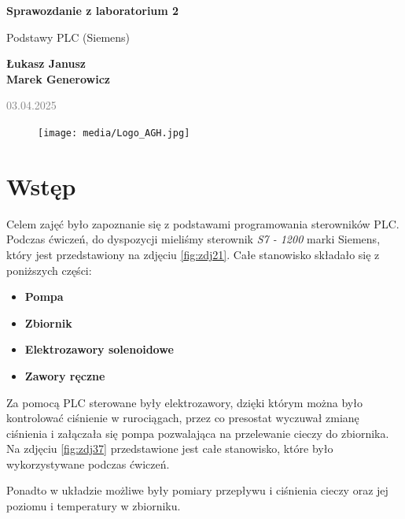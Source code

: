 \documentclass{article}
\begin{document}
\begin{titlepage}
    \begin{center}
        \vspace*{1cm}
            
        \Huge
        \textbf{Sprawozdanie z laboratorium 2}
            
        \vspace{0.5cm}
        \LARGE
        Podstawy PLC (Siemens) 
            
        \vspace{1.5cm}
            
        \textbf{Łukasz Janusz\\Marek Generowicz}

        \normalsize      
        \textcolor{gray}{03.04.2025}
        \vfill
        \begin{figure}[hb]
            \centering
            \texttt{[image: media/Logo\_AGH.jpg]}
        \end{figure}   
    \end{center}
\end{titlepage}

\newpage
\section{Wstęp}
Celem zajęć było zapoznanie się z podstawami programowania sterowników PLC. Podczas ćwiczeń, do dyspozycji mieliśmy sterownik \textit{S7 - 1200} marki Siemens, który jest przedstawiony na zdjęciu \ref{fig:zdj21}. Całe stanowisko składało się z poniższych części:

\begin{itemize}
    \item \textbf{Pompa} 
    \item \textbf{Zbiornik} 
    \item \textbf{Elektrozawory solenoidowe}
    \item \textbf{Zawory ręczne}  
\end{itemize}

Za pomocą PLC sterowane były elektrozawory, dzięki którym można było kontrolować ciśnienie w rurociągach, przez co presostat wyczuwał zmianę ciśnienia i załączała się pompa pozwalająca na przelewanie cieczy do zbiornika. Na zdjęciu \ref{fig:zdj37} przedstawione jest całe stanowisko, które było wykorzystywane podczas ćwiczeń.

Ponadto w układzie możliwe były pomiary przepływu i ciśnienia cieczy oraz jej poziomu i temperatury w zbiorniku.
\end{document}
